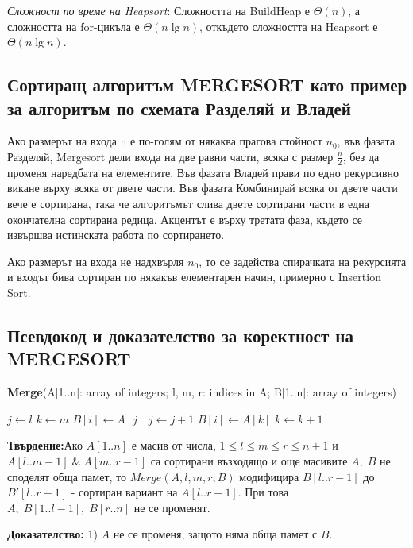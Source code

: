 \documentclass{article}
\renewcommand{\\}{\newline}
\newcommand{\amp}{\;\&\;}
\newcommand{\tv}{\textbf{Твърдение:\;}}
\newcommand{\doc}{\textbf{Доказателство: }}
\begin{document}
\textit{Сложност по време на Heapsort}: Сложността на BuildHeap е \(\Theta(n)\), а сложността на for-цикъла е \(\Theta(n\lg n)\), откъдето сложността на Heapsort е \(\Theta(n \lg n)\).    

\subsection{Сортиращ алгоритъм MERGESORT като пример за алгоритъм по схемата Разделяй и Владей}

Ако размерът на входа n е по-голям от някаква прагова стойност \(n_{0}\), във фазата Разделяй, Mergesort дели входа на две равни части, всяка с размер \(\frac{n}{2}\), без да променя наредбата на елементите. Във фазата Владей прави по едно рекурсивно викане върху всяка от двете части. Във фазата Комбинирай всяка от двете части вече е сортирана, така че алгоритъмът слива двете сортирани части в една окончателна сортирана редица. Акцентът е върху третата фаза, където се извършва истинската работа по сортирането.

Ако размерът на входа не надхвърля \(n_{0}\), то се задейства спирачката на рекурсията и входът бива сортиран по някакъв елементарен начин, примерно с Insertion Sort.

\subsection{Псевдокод и доказателство за коректност на MERGESORT}
\textbf{Merge}(A[1..n]: array of integers; l, m, r: indices in A; B[1..n]: array of integers) 
\begin{algorithmic}[1]
    \State \(j \gets l\)
    \State \(k \gets m\)
        \If{\((k = r) \text{ or } (k < r \amp j < m \amp A[j] \leq A[k] )\)}
            \State \(B[i] \gets A[j]\)
            \State \(j \gets j + 1\)
        \Else
            \State \(B[i] \gets A[k]\)
            \State \(k \gets k + 1\)
        \EndIf
    \EndFor
\end{algorithmic} 
\vspace{0.5cm}

\tv Ако \(A[1..n]\) е масив от числа, \(1 \leq l \leq m \leq r \leq n + 1\) и \(A[l..m-1] \amp A[m..r-1]\) са сортирани възходящо и още масивите \(A,\; B\) не споделят обща памет, то \(Merge(A, l, m, r, B)\) модифицира \(B[l..r-1]\) до \(B'[l..r-1]\) - сортиран вариант на \(A[l..r-1]\). При това \(A,\; B[1..l-1],\; B[r..n]\) не се променят. 

\doc 1) \(A\) не се променя, защото няма обща памет с \(B\). 
\end{document}
